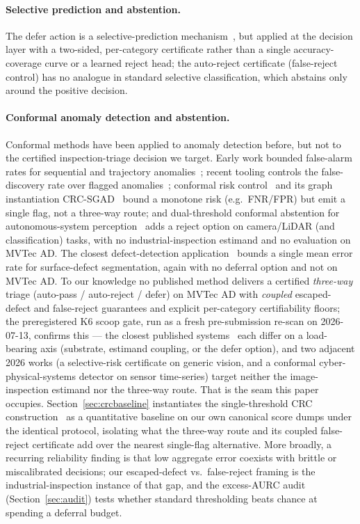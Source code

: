 \documentclass[preprint,11pt]{elsarticle}
\begin{document}
\paragraph{Selective prediction and abstention.} The defer action is a selective-prediction
mechanism~\citep{geifman2017selective,geifman2019selectivenet}, but applied at the decision layer
with a two-sided, per-category certificate rather than a single accuracy-coverage curve or a learned
reject head; the auto-reject certificate (false-reject control) has no analogue in standard
selective classification, which abstains only around the positive decision.

\paragraph{Conformal anomaly detection and abstention.} Conformal methods have been applied to
anomaly detection before, but not to the certified inspection-triage decision we target. Early
work bounded false-alarm rates for sequential and trajectory
anomalies~\citep{laxhammar2011sequential,laxhammar2015inductive}; recent tooling controls the
false-discovery rate over flagged anomalies~\citep{hennhofer2026nonconform}; conformal risk
control~\citep{angelopoulos2022crc} and its graph instantiation
CRC-SGAD~\citep{bai2025crcsgad} bound a monotone risk (e.g.\ FNR/FPR) but emit a single flag, not
a three-way route; and dual-threshold conformal abstention for autonomous-system
perception~\citep{kumar2025beyond} adds a reject option on camera/LiDAR (and classification)
tasks, with no industrial-inspection estimand and no evaluation on MVTec AD. The closest
defect-detection application~\citep{shen2025conformal} bounds a single mean error rate for
surface-defect segmentation, again with no deferral option and not on MVTec AD. To our knowledge
no published method delivers a certified \emph{three-way} triage (auto-pass / auto-reject / defer)
on MVTec AD with \emph{coupled} escaped-defect and false-reject guarantees and explicit
per-category certifiability floors; the preregistered K6 scoop gate, run as a fresh pre-submission
re-scan on 2026-07-13, confirms this --- the closest published
systems~\citep{kumar2025beyond,bai2025crcsgad,shen2025conformal} each differ on a load-bearing axis
(substrate, estimand coupling, or the defer option), and two adjacent 2026 works (a selective-risk
certificate on generic vision, and a conformal cyber-physical-systems detector on sensor
time-series) target neither the image-inspection estimand nor the three-way route. That
is the seam this paper occupies. Section~\ref{sec:crcbaseline} instantiates the single-threshold
CRC construction~\citep{angelopoulos2022crc} as a quantitative baseline on our own canonical score
dumps under the identical protocol, isolating what the three-way route and its coupled
false-reject certificate add over the nearest single-flag alternative. More broadly, a recurring
reliability finding is that low
aggregate error coexists with brittle or miscalibrated decisions; our escaped-defect vs.\
false-reject framing is the industrial-inspection instance of that gap, and the excess-AURC audit
(Section~\ref{sec:audit}) tests whether standard thresholding beats chance at spending a deferral
budget.
\end{document}
